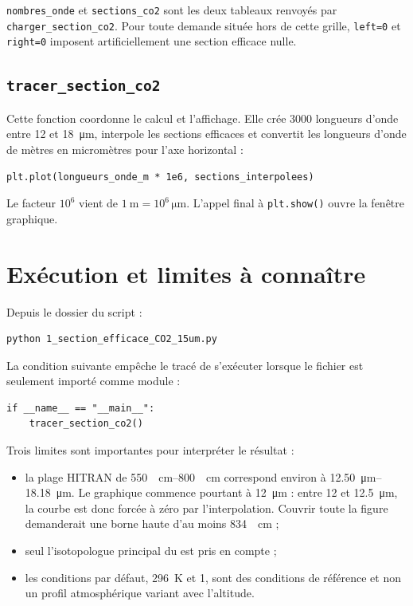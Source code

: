 \documentclass[11pt,a4paper]{article}
\newcommand{\code}[1]{\texttt{#1}}
\begin{document}
\code{nombres\_onde} et \code{sections\_co2} sont les deux tableaux renvoyés
par \code{charger\_section\_co2}. Pour toute demande située hors de cette
grille, \code{left=0} et \code{right=0} imposent artificiellement une section
efficace nulle.

\subsection{\code{tracer\_section\_co2}}

Cette fonction coordonne le calcul et l'affichage. Elle crée 3000 longueurs
d'onde entre 12 et \SI{18}{\micro\metre}, interpole les sections efficaces et
convertit les longueurs d'onde de mètres en micromètres pour l'axe horizontal :

\begin{lstlisting}
plt.plot(longueurs_onde_m * 1e6, sections_interpolees)
\end{lstlisting}

Le facteur $10^6$ vient de
$\SI{1}{\metre}=10^6\,\si{\micro\metre}$. L'appel final à \code{plt.show()}
ouvre la fenêtre graphique.

\section{Exécution et limites à connaître}

Depuis le dossier du script :

\begin{lstlisting}[language=bash]
python 1_section_efficace_CO2_15um.py
\end{lstlisting}

La condition suivante empêche le tracé de s'exécuter lorsque le fichier est
seulement importé comme module :

\begin{lstlisting}
if __name__ == "__main__":
    tracer_section_co2()
\end{lstlisting}

Trois limites sont importantes pour interpréter le résultat :

\begin{itemize}
  \item la plage HITRAN de \SIrange{550}{800}{\per\centi\metre} correspond
        environ à \SIrange{12.50}{18.18}{\micro\metre}. Le graphique commence
        pourtant à \SI{12}{\micro\metre} : entre 12 et
        \SI{12.5}{\micro\metre}, la courbe est donc forcée à zéro par
        l'interpolation. Couvrir toute la figure demanderait une borne haute
        d'au moins \SI{834}{\per\centi\metre} ;
  \item seul l'isotopologue principal du  est pris en compte ;
  \item les conditions par défaut, \SI{296}{\kelvin} et \SI{1}{\atm}, sont des
        conditions de référence et non un profil atmosphérique variant avec
        l'altitude.
\end{itemize}
\end{document}
